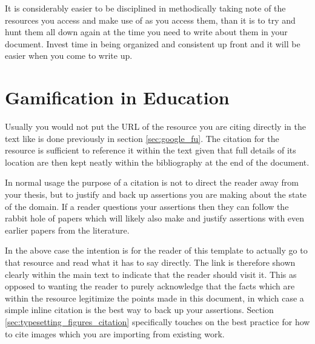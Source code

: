 		It is considerably easier to be disciplined in methodically taking note of the resources you access and make use of as you access them, than it is to try and hunt them all down again at the time you need to write about them in your document. Invest time in being organized and consistent up front and it will be easier when you come to write up.
		
	\section{Gamification in Education}
		\label{sec:gamification_edu}
		Usually you would not put the URL of the resource you are citing directly in the text like is done previously in section \ref{sec:google_fu}. The citation for the resource \cite{gwern} is sufficient to reference it within the text given that full details of its location are then kept neatly within the bibliography at the end of the document. 
		
		In normal usage the purpose of a citation is not to direct the reader away from your thesis, but to justify and back up assertions you are making about the state of the domain. If a reader questions your assertions then they can follow the rabbit hole of papers which will likely also make and justify assertions with even earlier papers from the literature. 
		
		In the above case the intention is for the reader of this template to actually go to that resource and read what it has to say directly. The link is therefore shown clearly within the main text to indicate that the reader should visit it. This as opposed to wanting the reader to purely acknowledge that the facts which are within the resource legitimize the points made in this document, in which case a simple inline citation is the best way to back up your assertions. Section \ref{sec:typesetting_figures_citation} specifically touches on the best practice for how to cite images which you are importing from existing work. 